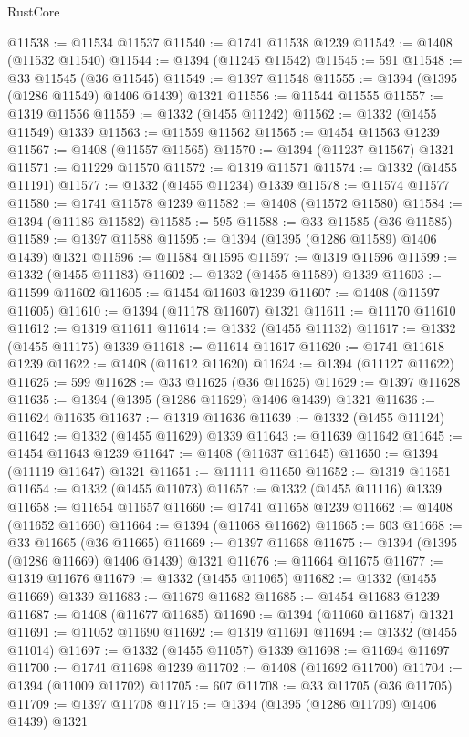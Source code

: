 \begin{lexlean}{RustCore}
\begin{coremodule}
@11538 := @11534 @11537
@11540 := @1741 @11538 @1239
@11542 := @1408 (@11532 @11540)
@11544 := @1394 (@11245 @11542)
@11545 := 591
@11548 := @33 @11545 (@36 @11545)
@11549 := @1397 @11548
@11555 := @1394 (@1395 (@1286 @11549) @1406 @1439) @1321
@11556 := @11544 @11555
@11557 := @1319 @11556
@11559 := @1332 (@1455 @11242)
@11562 := @1332 (@1455 @11549) @1339
@11563 := @11559 @11562
@11565 := @1454 @11563 @1239
@11567 := @1408 (@11557 @11565)
@11570 := @1394 (@11237 @11567) @1321
@11571 := @11229 @11570
@11572 := @1319 @11571
@11574 := @1332 (@1455 @11191)
@11577 := @1332 (@1455 @11234) @1339
@11578 := @11574 @11577
@11580 := @1741 @11578 @1239
@11582 := @1408 (@11572 @11580)
@11584 := @1394 (@11186 @11582)
@11585 := 595
@11588 := @33 @11585 (@36 @11585)
@11589 := @1397 @11588
@11595 := @1394 (@1395 (@1286 @11589) @1406 @1439) @1321
@11596 := @11584 @11595
@11597 := @1319 @11596
@11599 := @1332 (@1455 @11183)
@11602 := @1332 (@1455 @11589) @1339
@11603 := @11599 @11602
@11605 := @1454 @11603 @1239
@11607 := @1408 (@11597 @11605)
@11610 := @1394 (@11178 @11607) @1321
@11611 := @11170 @11610
@11612 := @1319 @11611
@11614 := @1332 (@1455 @11132)
@11617 := @1332 (@1455 @11175) @1339
@11618 := @11614 @11617
@11620 := @1741 @11618 @1239
@11622 := @1408 (@11612 @11620)
@11624 := @1394 (@11127 @11622)
@11625 := 599
@11628 := @33 @11625 (@36 @11625)
@11629 := @1397 @11628
@11635 := @1394 (@1395 (@1286 @11629) @1406 @1439) @1321
@11636 := @11624 @11635
@11637 := @1319 @11636
@11639 := @1332 (@1455 @11124)
@11642 := @1332 (@1455 @11629) @1339
@11643 := @11639 @11642
@11645 := @1454 @11643 @1239
@11647 := @1408 (@11637 @11645)
@11650 := @1394 (@11119 @11647) @1321
@11651 := @11111 @11650
@11652 := @1319 @11651
@11654 := @1332 (@1455 @11073)
@11657 := @1332 (@1455 @11116) @1339
@11658 := @11654 @11657
@11660 := @1741 @11658 @1239
@11662 := @1408 (@11652 @11660)
@11664 := @1394 (@11068 @11662)
@11665 := 603
@11668 := @33 @11665 (@36 @11665)
@11669 := @1397 @11668
@11675 := @1394 (@1395 (@1286 @11669) @1406 @1439) @1321
@11676 := @11664 @11675
@11677 := @1319 @11676
@11679 := @1332 (@1455 @11065)
@11682 := @1332 (@1455 @11669) @1339
@11683 := @11679 @11682
@11685 := @1454 @11683 @1239
@11687 := @1408 (@11677 @11685)
@11690 := @1394 (@11060 @11687) @1321
@11691 := @11052 @11690
@11692 := @1319 @11691
@11694 := @1332 (@1455 @11014)
@11697 := @1332 (@1455 @11057) @1339
@11698 := @11694 @11697
@11700 := @1741 @11698 @1239
@11702 := @1408 (@11692 @11700)
@11704 := @1394 (@11009 @11702)
@11705 := 607
@11708 := @33 @11705 (@36 @11705)
@11709 := @1397 @11708
@11715 := @1394 (@1395 (@1286 @11709) @1406 @1439) @1321

\end{coremodule}
\end{lexlean}
